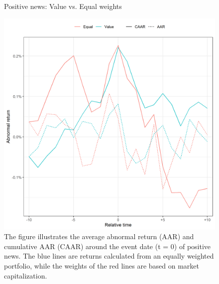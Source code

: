 \begin{figure} [H]
    \centering
    \caption{Positive news: Value vs. Equal weights}
    \includegraphics[scale=0.6]{Projekt/1.Figures analysis/ST_positive_sensitivity_weight.png}
     \caption*{\footnotesize The figure illustrates the average abnormal return (AAR) and cumulative AAR (CAAR) around the event date (t = 0) of positive news. The blue lines are returns calculated from an equally weighted portfolio, while the weights of the red lines are based on market capitalization. }
    \label{fig:ST_pos_sensitivity_weights}
\end{figure} 